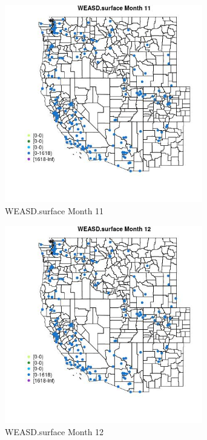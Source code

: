 \begin{figure} 
\centering  
\includegraphics[width=0.77\textwidth]{Code_Outputs/Report_ML_input_PM25_Step4_part_e_de_duplicated_aveswNAs_MapObsMo11WEASDsurface.jpg} 
\caption{\label{fig:Report_ML_input_PM25_Step4_part_e_de_duplicated_aveswNAsMapObsMo11WEASDsurface}WEASD.surface Month 11} 
\end{figure} 
 

\begin{figure} 
\centering  
\includegraphics[width=0.77\textwidth]{Code_Outputs/Report_ML_input_PM25_Step4_part_e_de_duplicated_aveswNAs_MapObsMo12WEASDsurface.jpg} 
\caption{\label{fig:Report_ML_input_PM25_Step4_part_e_de_duplicated_aveswNAsMapObsMo12WEASDsurface}WEASD.surface Month 12} 
\end{figure} 
 

